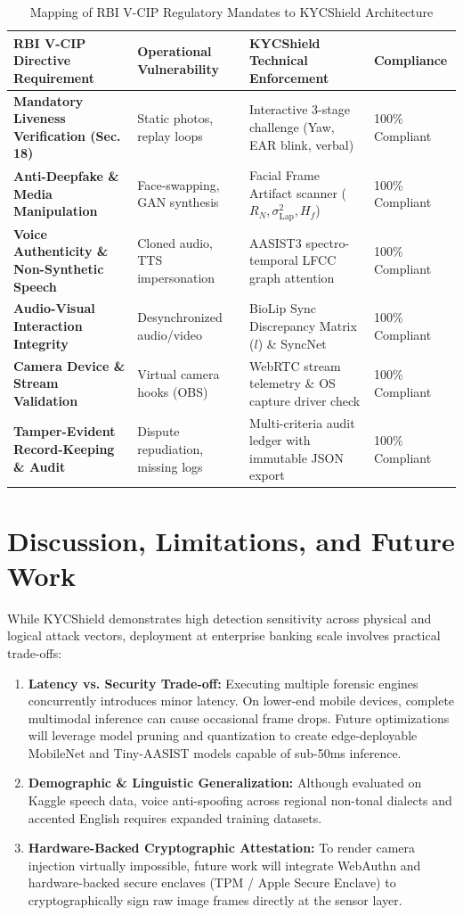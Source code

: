 \documentclass[conference]{IEEEtran}
\begin{document}
\begin{table}[t]
\centering
\caption{Mapping of RBI V-CIP Regulatory Mandates to KYCShield Architecture}
\label{tab:compliance}
\begin{tabular}{llll}
\toprule
\textbf{RBI V-CIP Directive Requirement} & \textbf{Operational Vulnerability} & \textbf{KYCShield Technical Enforcement} & \textbf{Compliance} \\
\midrule
\textbf{Mandatory Liveness Verification (Sec. 18)} & Static photos, replay loops & Interactive 3-stage challenge (Yaw, EAR blink, verbal) & 100\% Compliant \\
\textbf{Anti-Deepfake \& Media Manipulation} & Face-swapping, GAN synthesis & Facial Frame Artifact scanner ($R_N, \sigma^2_{\text{Lap}}, H_f$) & 100\% Compliant \\
\textbf{Voice Authenticity \& Non-Synthetic Speech} & Cloned audio, TTS impersonation & AASIST3 spectro-temporal LFCC graph attention \cite{borodin2024aasist3} & 100\% Compliant \\
\textbf{Audio-Visual Interaction Integrity} & Desynchronized audio/video & BioLip Sync Discrepancy Matrix ($l$) \& SyncNet & 100\% Compliant \\
\textbf{Camera Device \& Stream Validation} & Virtual camera hooks (OBS) & WebRTC stream telemetry \& OS capture driver check \cite{iso30107} & 100\% Compliant \\
\textbf{Tamper-Evident Record-Keeping \& Audit} & Dispute repudiation, missing logs & Multi-criteria audit ledger with immutable JSON export & 100\% Compliant \\
\bottomrule
\end{tabular}
\end{table}

\section{Discussion, Limitations, and Future Work}
While KYCShield demonstrates high detection sensitivity across physical and logical attack vectors, deployment at enterprise banking scale involves practical trade-offs:
\begin{enumerate}
    \item \textbf{Latency vs. Security Trade-off:} Executing multiple forensic engines concurrently introduces minor latency. On lower-end mobile devices, complete multimodal inference can cause occasional frame drops. Future optimizations will leverage model pruning and quantization to create edge-deployable MobileNet and Tiny-AASIST models capable of sub-50ms inference.
    \item \textbf{Demographic \& Linguistic Generalization:} Although evaluated on Kaggle speech data, voice anti-spoofing across regional non-tonal dialects and accented English requires expanded training datasets.
    \item \textbf{Hardware-Backed Cryptographic Attestation:} To render camera injection virtually impossible, future work will integrate WebAuthn and hardware-backed secure enclaves (TPM / Apple Secure Enclave) to cryptographically sign raw image frames directly at the sensor layer.
\end{enumerate}
\end{document}

